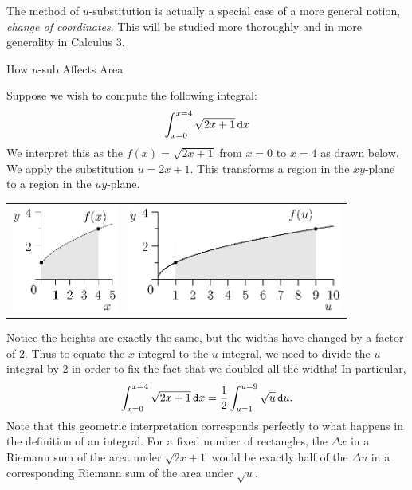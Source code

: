 The method of $u$-substitution is actually a special case of a more general notion, \emph{change of coordinates}.  This will be studied more thoroughly and in more generality in Calculus 3.  

\begin{example}{How $u$-sub Affects Area}

Suppose we wish to compute the following integral: $$\int_{x=0}^{x=4}\sqrt{2x+1} \mathop{}\!\mathtt{d} x $$ 
We interpret this as the  $f(x)=\sqrt{2x+1}$ from $x=0$ to $x=4$ as drawn below.  We apply the substitution $u=2x+1$.
This transforms a region in the $xy$-plane to a region in the $uy$-plane.
\begin{center}
\begin{tabular}{c c}
    \includegraphics[height=100pt]{ChapterAntidiff/Figures/usubint1.eps}
	&
    \includegraphics[height=100pt]{ChapterAntidiff/Figures/usubint2.eps}
\end{tabular}
\end{center}

Notice the heights are exactly the same, but the widths have changed by a factor of 2.  Thus to equate the $x$ integral to the $u$ integral, we need to divide the $u$ integral by 2 in order to fix the fact that we doubled all the widths!  In particular, $$\int_{x=0}^{x=4}\sqrt{2x+1} \mathop{}\!\mathtt{d} x =\frac{1}{2}\int_{u=1}^{u=9}\sqrt{u} \mathop{}\!\mathtt{d} u.  $$
Note that this geometric interpretation corresponds perfectly to what happens in the  definition of an integral.  For a fixed number of rectangles, the $\Delta x$ in a Riemann sum of the area under $\sqrt{2x+1}$ would be exactly half of the $ \Delta u$ in a corresponding Riemann sum of the area under $\sqrt{u}$.

\end{example}

